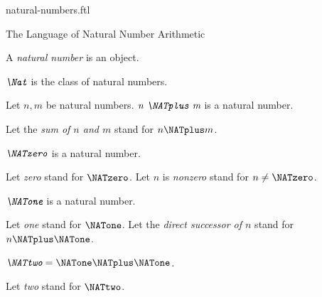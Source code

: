 \documentclass{naproche-library}
\begin{document}
\begin{smodule}[title=Natural Numbers]{natural-numbers.ftl}

\begin{sfragment}{The Language of Natural Number Arithmetic}

  \begin{signature}[forthel,id=ARITHMETIC_01_3074681254969344]
    A \emph{natural number} is an object.
  \end{signature}

  \begin{definition}[forthel,id=ARITHMETIC_01_7367148418629632]
    $\emph{\Nat}$ is the class of natural numbers.
  \end{definition}

  \begin{signature}[forthel,id=ARITHMETIC_01_1567933815848960]
    Let $n, m$ be natural numbers.
    $\emph{n \NATplus m}$ is a natural number.

    Let the \emph{sum of $n$ and $m$} stand for $n \NATplus m$.
  \end{signature}

  \begin{signature}[forthel,id=ARITHMETIC_01_7633304715001856]
    $\emph{\NATzero}$ is a natural number.

    Let \emph{zero} stand for $\NATzero$.
    Let $n$ is \emph{nonzero} stand for $n \neq \NATzero$.
  \end{signature}

  \begin{signature}[forthel,id=ARITHMETIC_01_1200254566985232]
    $\emph{\NATone}$ is a natural number.

    Let \emph{one} stand for $\NATone$.
    Let the \emph{direct successor of $n$} stand for $n \NATplus \NATone$.
  \end{signature}

  \begin{definition}[forthel,id=ARITHMETIC_01_4584236572999680]
    $\emph{\NATtwo} = \NATone \NATplus \NATone$.

    Let \emph{two} stand for $\NATtwo$.
  \end{definition}


\end{sfragment}
\end{smodule}
\end{document}
